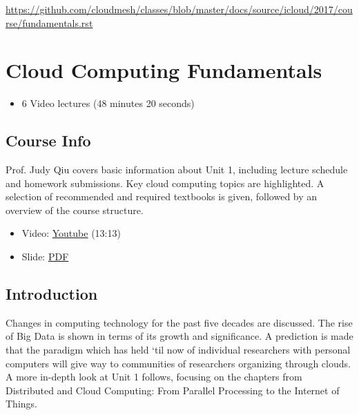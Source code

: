 \begin{fileremark}\url{https://github.com/cloudmesh/classes/blob/master/docs/source/icloud/2017/course/fundamentals.rst}\end{fileremark}
\section{Cloud Computing
Fundamentals}\label{cloud-computing-fundamentals}

\begin{itemize}
\tightlist
\item
  6 Video lectures (48 minutes 20 seconds)
\end{itemize}

\subsection{Course Info}\label{course-info}

Prof. Judy Qiu covers basic information about Unit 1, including lecture
schedule and homework submissions. Key cloud computing topics are
highlighted. A selection of recommended and required textbooks is given,
followed by an overview of the course structure.

\begin{itemize}
\tightlist
\item
  Video: \href{https://www.youtube.com/watch?v=Kde5YVUwDTQ}{Youtube}
  (13:13)
\end{itemize}

\begin{itemize}
\tightlist
\item
  Slide:
  \href{https://drive.google.com/open?id=0B88HKpainTSfYjU4QzdDSms0Nk0}{PDF}
\end{itemize}

\subsection{Introduction}\label{introduction}

Changes in computing technology for the past five decades are discussed.
The rise of Big Data is shown in terms of its growth and significance. A
prediction is made that the paradigm which has held `til now of
individual researchers with personal computers will give way to
communities of researchers organizing through clouds. A more in-depth
look at Unit 1 follows, focusing on the chapters from Distributed and
Cloud Computing: From Parallel Processing to the Internet of Things.

